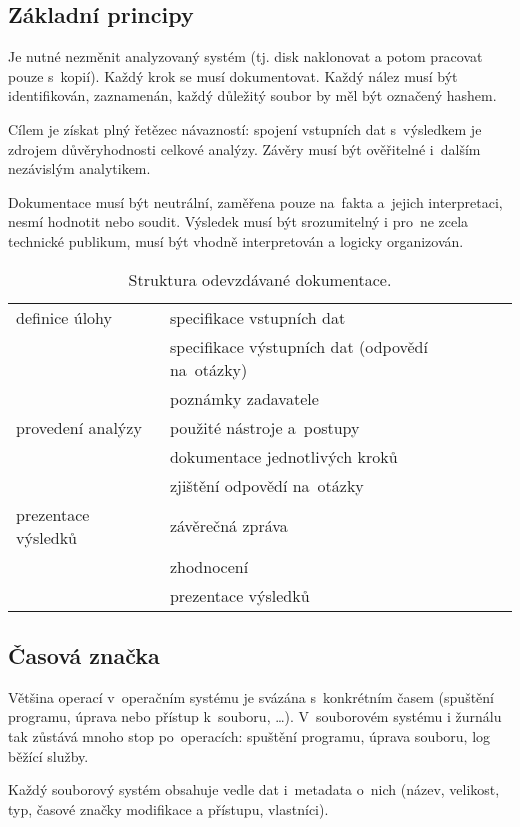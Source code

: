 \subsection{Základní principy}

Je nutné nezměnit analyzovaný systém (tj. disk naklonovat a potom pracovat pouze s~kopií).
Každý krok se musí dokumentovat.
Každý nález musí být identifikován, zaznamenán, každý důležitý soubor by měl být označený hashem.

Cílem je získat plný řetězec návazností: spojení vstupních dat s~výsledkem je zdrojem důvěryhodnosti celkové analýzy.
Závěry musí být ověřitelné i~dalším nezávislým analytikem.

Dokumentace musí být neutrální, zaměřena pouze na~fakta a~jejich interpretaci, nesmí hodnotit nebo soudit.
Výsledek musí být srozumitelný i pro~ne zcela technické publikum, musí být vhodně interpretován a logicky organizován.

\begin{table}[ht]
\centering
\onehalfspacing
\begin{tabular}{ll}
definice úlohy
& specifikace vstupních dat \\
& specifikace výstupních dat (odpovědí na~otázky) \\
& poznámky zadavatele \\
\hline
provedení analýzy
& použité nástroje a~postupy \\
& dokumentace jednotlivých kroků \\
& zjištění odpovědí na~otázky \\
\hline
prezentace výsledků
& závěrečná zpráva \\
& zhodnocení \\
& prezentace výsledků \\
\end{tabular}
\caption{Struktura odevzdávané dokumentace.}
\end{table}
\FloatBarrier


\subsection{Časová značka}

Většina operací v~operačním systému je svázána s~konkrétním časem (spuštění programu, úprava nebo přístup k~souboru, \dots).
V~souborovém systému i žurnálu tak zůstává mnoho stop po~operacích: spuštění programu, úprava souboru, log běžící služby.

Každý souborový systém obsahuje vedle dat i~metadata o~nich (název, velikost, typ, časové značky modifikace a přístupu, vlastníci).


